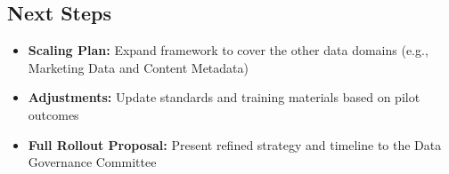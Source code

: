 \documentclass[11pt,a4paper,computermodern]{article}
\begin{document}
\subsection*{Next Steps}

\begin{itemize}[itemsep=5pt, parsep=0pt]
	\item \textbf{Scaling Plan:} Expand framework to cover the other data domains (e.g., Marketing Data and Content Metadata)
	\item \textbf{Adjustments:} Update standards and training materials based on pilot outcomes
	\item \textbf{Full Rollout Proposal:} Present refined strategy and timeline to the Data Governance Committee
\end{itemize}

%
%
\end{document}
